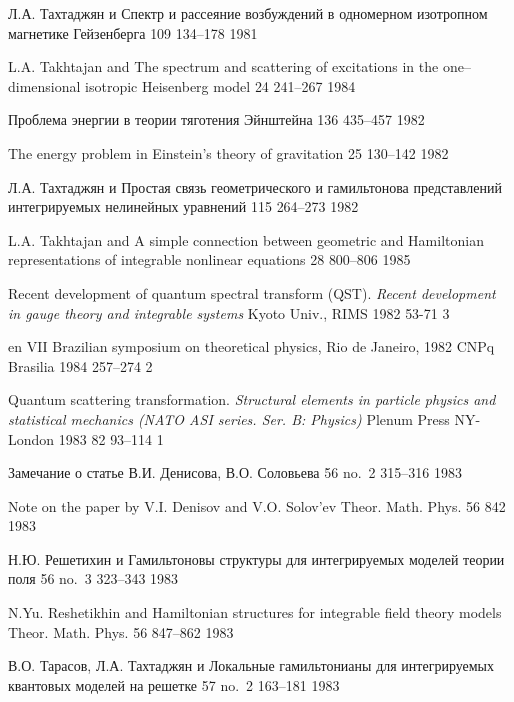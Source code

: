 {Л.А. Тахтаджян и \LD}
{Спектр и рассеяние возбуждений в одномерном изотропном магнетике Гейзенберга}
{\Zap} {109} {} {134--178} {1981}

{L.A. Takhtajan and \LF}
{The spectrum and scattering of excitations in the one--dimensional
  isotropic Heisenberg model}
{\JSM} {24} {241--267} {1984}

{\LD}
{Проблема энергии в теории тяготения Эйнштейна}
{\UFN} {136} {} {435--457} {1982}

{\LF}
{The energy problem in Einstein's theory of gravitation}
{\SPU} {25} {130--142} {1982}

{Л.А. Тахтаджян и \LD}
{Простая связь геометрического и гамильтонова представлений
 интегрируемых нелинейных уравнений}
{\Zap} {115} {} {264--273} {1982}

{L.A. Takhtajan and \LF}
{A simple connection between geometric and Hamiltonian
  representations of integrable nonlinear equations}
{\JSM} {28} {800--806} {1985}

{\LF}
{Recent development of quantum spectral transform (QST).} 
{\em Recent development in gauge theory and integrable systems}
{Kyoto Univ., RIMS} {} {1982} {} {53-71} {3}

{en}
{VII Brazilian symposium on theoretical physics, Rio de Janeiro, 1982}
{CNPq} {Brasilia} {1984} {} {257--274} {2}

{\LF}
{Quantum scattering transformation.}
{\em Structural elements in particle physics and
 statistical mechanics (NATO ASI series. Ser. B: Physics)}
{Plenum Press} {NY-London} {1983} {82} {93--114} {1}

{\LD}
{Замечание о статье В.И. Денисова, В.О. Соловьева}
{\TMF} {56} {no.~2} {315--316} {1983}

{\LF}
{Note on the paper by V.I. Denisov and V.O. Solov'ev}
{Theor. Math. Phys.} {56} {842} {1983}

{Н.Ю. Решетихин и \LD}
{Гамильтоновы структуры для интегрируемых моделей теории поля}
{\TMF} {56} {no.~3} {323--343} {1983}

{N.Yu. Reshetikhin and \LF}
{Hamiltonian structures for integrable field theory models}
{Theor. Math. Phys.} {56} {847--862} {1983}

{В.О. Тарасов, Л.А. Тахтаджян и \LD}
{Локальные гамильтонианы для интегрируемых квантовых моделей на решетке}
{\TMF} {57} {no.~2} {163--181} {1983}

